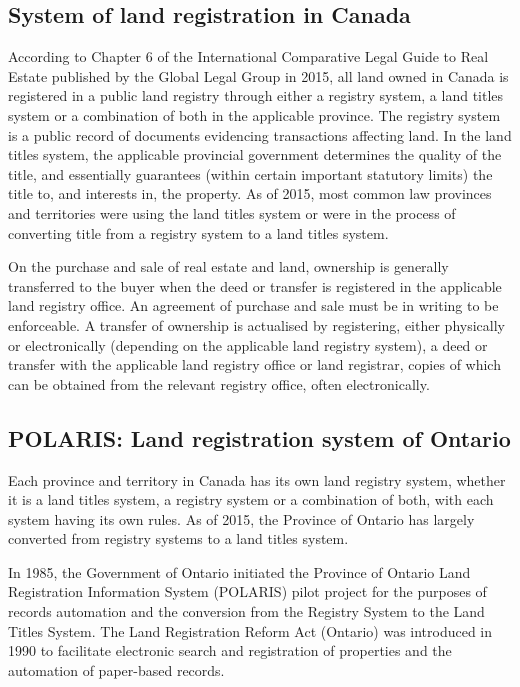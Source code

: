 \subsection{System of land registration in Canada} \label{subsec:land_reg_system_canada}

According to Chapter 6 of the International Comparative Legal Guide to Real Estate published by the Global Legal Group in 2015\cite{McKean2015}, all land owned in Canada is registered in a public land registry through either a registry system, a land titles system or a combination of both in the applicable province.
The registry system is a public record of documents evidencing transactions affecting land.
In the land titles system, the applicable provincial government determines the quality of the title, and essentially guarantees (within certain important statutory limits) the title to, and interests in, the property.
As of 2015, most common law provinces and territories were using the land titles system or were in the process of converting title from a registry system to a land titles system.

On the purchase and sale of real estate and land, ownership is generally transferred to the buyer when the deed or transfer is registered in the applicable land registry office.
An agreement of purchase and sale must be in writing to be enforceable.
A transfer of ownership is actualised by registering, either physically or electronically (depending on the applicable land registry system), a deed or transfer with the applicable land registry office or land registrar, copies of which can be obtained from the relevant registry office, often electronically.

\subsection{POLARIS: Land registration system of Ontario} \label{subsec:polaris}

Each province and territory in Canada has its own land registry system, whether it is a land titles system, a registry system or a combination of both, with each system having its own rules.
As of 2015, the Province of Ontario has largely converted from registry systems to a land titles system.

In 1985, the Government of Ontario initiated the Province of Ontario Land Registration Information System (POLARIS) pilot project for the purposes of records automation and the conversion from the Registry System to the Land Titles System.
The Land Registration Reform Act (Ontario)\cite{TheGovernmentofOntario1990} was introduced in 1990 to facilitate electronic search and registration of properties and the automation of paper-based records.

